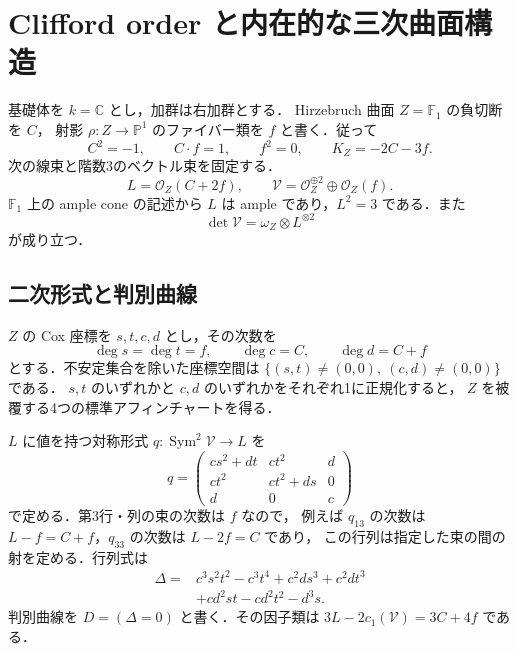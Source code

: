 \section{Clifford order と内在的な三次曲面構造}
\label{sec:construction}

基礎体を $k=\mathbb C$ とし，加群は右加群とする．
Hirzebruch 曲面 $Z=\mathbb F_1$ の負切断を $C$，
射影 $\rho:Z\to\mathbb P^1$ のファイバー類を $f$ と書く．従って
\[
 C^2=-1,\qquad C\cdot f=1,\qquad f^2=0,
 \qquad K_Z=-2C-3f.
\]
次の線束と階数3のベクトル束を固定する．
\begin{equation}
 L=\mathcal O_Z(C+2f),\qquad
 \mathcal V=\mathcal O_Z^{\oplus2}\oplus\mathcal O_Z(f).
 \label{eq:choice-LV}
\end{equation}
$\mathbb F_1$ 上の ample cone の記述から $L$ は ample であり，$L^2=3$ である．また
\begin{equation}
 \det\mathcal V=\omega_Z\otimes L^{\otimes2}
 \label{eq:determinant-V}
\end{equation}
が成り立つ．

\subsection{二次形式と判別曲線}

$Z$ の Cox 座標を $s,t,c,d$ とし，その次数を
\[
 \deg s=\deg t=f,\qquad \deg c=C,\qquad \deg d=C+f
\]
とする．不安定集合を除いた座標空間は
$\{(s,t)\ne(0,0),\ (c,d)\ne(0,0)\}$ である．
$s,t$ のいずれかと $c,d$ のいずれかをそれぞれ1に正規化すると，
$Z$ を被覆する4つの標準アフィンチャートを得る．

$L$ に値を持つ対称形式 $q:\operatorname{Sym}^2\mathcal V\to L$ を
\begin{equation}
 q=
 \begin{pmatrix}
 cs^2+dt&ct^2&d\\
 ct^2&ct^2+ds&0\\
 d&0&c
 \end{pmatrix}
 \label{eq:explicit-q}
\end{equation}
で定める．第3行・列の束の次数は $f$ なので，
例えば $q_{13}$ の次数は $L-f=C+f$，$q_{33}$ の次数は $L-2f=C$ であり，
この行列は指定した束の間の射を定める．行列式は
\begin{equation}
 \begin{split}
 \Delta={}&c^3s^2t^2-c^3t^4+c^2ds^3+c^2dt^3\\
          &+cd^2st-cd^2t^2-d^3s.
 \end{split}
 \label{eq:explicit-discriminant}
\end{equation}
判別曲線を $D=(\Delta=0)$ と書く．その因子類は
$3L-2c_1(\mathcal V)=3C+4f$ である．

